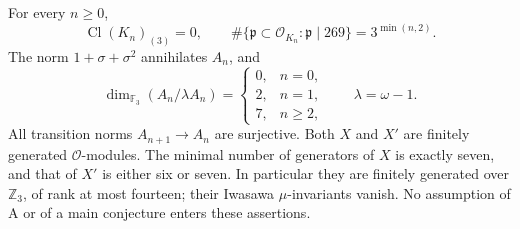 \begin{theorem}
\label{AC-K16}
For every $n\geq0$,
\[
 \operatorname{Cl}(K_n)_{(3)}=0,\qquad
 \#\{\mathfrak p\subset\mathcal O_{K_n}:\mathfrak p\mid269\}
       =3^{\min(n,2)}.                                  \tag{KI.1}
\]
The norm $1+\sigma+\sigma^2$ annihilates $A_n$, and
\[
 \dim_{\mathbb F_3}(A_n/\lambda A_n)
 =
 \begin{cases}
 0,&n=0,\\
 2,&n=1,\\
 7,&n\geq2,
 \end{cases}
 \qquad \lambda=\omega-1.                              \tag{KI.2}
\]
All transition norms $A_{n+1}\to A_n$ are surjective.
Both $X$ and $X'$ are finitely generated $\mathcal O$-modules.
The minimal number of generators of $X$ is exactly seven,
and that of $X'$ is either six or seven.  In particular they are finitely
generated over $\mathbb Z_3$, of rank at most fourteen; their
Iwasawa $\mu$-invariants vanish.  No assumption of A or of a
main conjecture enters these assertions.
\end{theorem}
